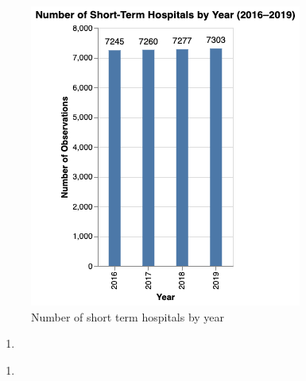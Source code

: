 \documentclass[
  letterpaper,
  DIV=11,
  numbers=noendperiod]{scrartcl}
\providecommand{\tightlist}{%
  \setlength{\itemsep}{0pt}\setlength{\parskip}{0pt}}\usepackage{longtable,booktabs,array}
\begin{document}
\begin{figure}[H]

{\centering \includegraphics{1-3.png}

}

\caption{Number of short term hospitals by year}

\end{figure}%

\begin{enumerate}
\def\labelenumi{\arabic{enumi}.}
\setcounter{enumi}{3}
\tightlist
\item
\end{enumerate}

\begin{enumerate}
\def\labelenumi{\alph{enumi}.}
\tightlist
\item
\end{enumerate}
\end{document}
